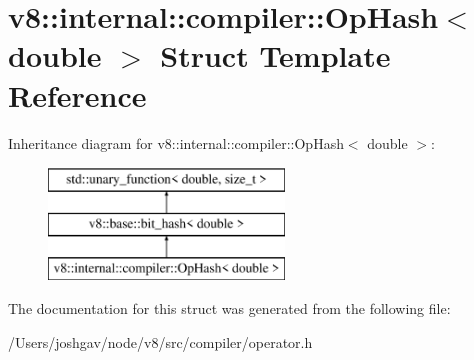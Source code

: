 \hypertarget{structv8_1_1internal_1_1compiler_1_1_op_hash_3_01double_01_4}{}\section{v8\+:\+:internal\+:\+:compiler\+:\+:Op\+Hash$<$ double $>$ Struct Template Reference}
\label{structv8_1_1internal_1_1compiler_1_1_op_hash_3_01double_01_4}
Inheritance diagram for v8\+:\+:internal\+:\+:compiler\+:\+:Op\+Hash$<$ double $>$\+:\begin{figure}[H]
\begin{center}
\leavevmode
\includegraphics[height=3.000000cm]{structv8_1_1internal_1_1compiler_1_1_op_hash_3_01double_01_4}
\end{center}
\end{figure}


The documentation for this struct was generated from the following file\+:\begin{DoxyCompactItemize}
\item 
/\+Users/joshgav/node/v8/src/compiler/operator.\+h\end{DoxyCompactItemize}
